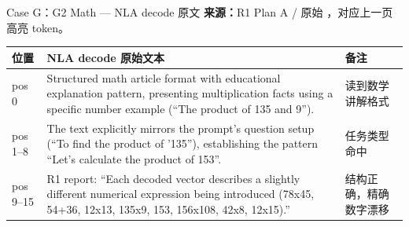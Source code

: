 \begin{frame}{Case G：G2 Math — NLA decode 原文}
\scriptsize
\textbf{来源：}R1 Plan A / 原始 ，对应上一页高亮 token。

\begin{tabularx}{\linewidth}{l>{\raggedright\arraybackslash}X>{\raggedright\arraybackslash}p{2.0cm}}
\toprule
位置 & NLA decode 原始文本 & 备注 \\
\midrule
pos 0 & Structured math article format with educational explanation pattern, presenting multiplication facts using a specific number example (``The product of 135 and 9''). & 读到数学讲解格式 \\
pos 1--8 & The text explicitly mirrors the prompt's question setup (``To find the product of '135''), establishing the pattern ``Let's calculate the product of 153''. & 任务类型命中 \\
pos 9--15 & R1 report: ``Each decoded vector describes a slightly different numerical expression being introduced (78x45, 54+36, 12x13, 135x9, 153, 156x108, 42x8, 12x15).'' & 结构正确，精确数字漂移 \\
\bottomrule
\end{tabularx}
\end{frame}

